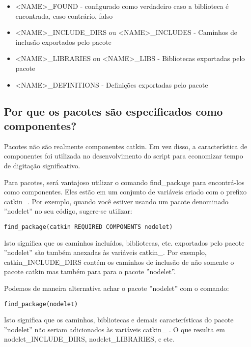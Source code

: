 \begin{itemize}
	\setlength{\itemsep}{1pt}
	\setlength{\parskip}{0pt}
	\setlength{\parsep}{0pt}
	\item[]<NAME>\_FOUND - configurado como verdadeiro caso a biblioteca é encontrada, caso contrário, falso
	\item[]<NAME>\_INCLUDE\_DIRS ou <NAME>\_INCLUDES - Caminhos de inclusão exportados pelo pacote
	\item[]<NAME>\_LIBRARIES ou <NAME>\_LIBS - Bibliotecas exportadas pelo pacote
	\item[]<NAME>\_DEFINITIONS - Definições exportadas pelo pacote
\end{itemize}


\subsection{Por que os pacotes são especificados como componentes?}

Pacotes não são realmente componentes catkin. Em vez disso, a característica de componentes foi utilizada no desenvolvimento do script para economizar tempo de digitação significativo.

Para pacotes, será vantajoso utilizar o comando find\_package para encontrá-los como componentes. Eles estão em um conjunto de variáveis criado com o prefixo catkin\_. Por exemplo, quando você estiver usando um pacote denominado ''nodelet'' no seu código, sugere-se utilizar:

\begin{verbatim} 
find_package(catkin REQUIRED COMPONENTS nodelet)
\end{verbatim}

Isto significa que os caminhos incluídos, bibliotecas, etc. exportados pelo pacote ''nodelet'' são também anexadas às variáveis catkin\_. Por exemplo, catkin\_INCLUDE\_DIRS contém os caminhos de inclusão de não somente o pacote catkin mas também para para o pacote ''nodelet''. 

Podemos de maneira alternativa achar o pacote ''nodelet'' com o comando:

\begin{verbatim} 
find_package(nodelet)
\end{verbatim}

Isto significa que os caminhos, bibliotecas e demais características do pacote ''nodelet'' não seriam adicionados às variáveis catkin\_ . O que resulta em nodelet\_INCLUDE\_DIRS, nodelet\_LIBRARIES, e etc. 

